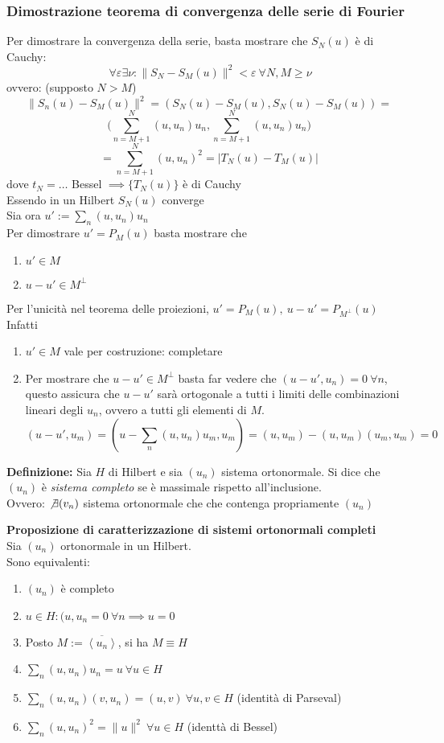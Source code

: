 \subsubsection{Dimostrazione teorema di convergenza delle serie di Fourier}
Per dimostrare la convergenza della serie, basta mostrare che $S_N(u)$ è di Cauchy:
\[\ \forall \varepsilon\exists \nu:\|S_N-S_M(u)\|^2<\varepsilon\ \forall N,M\ge \nu\]
ovvero: (supposto $N>M$)
\[\|S_n(u)-S_M(u)\|^2=(S_N(u)-S_M(u),S_N(u)-S_M(u))=\]
\[\bigg(\sum_{n=M+1}^{N} (u,u_n)u_n,\sum_{n=M+1}^{N} (u,u_n)u_n\bigg)\]
\[=\sum_{n=M+1}^{N} (u,u_n)^2=|T_N(u)-T_M(u)|\]
dove $t_N=\ldots$ 
Bessel $\implies \{T_N(u)\} $ è di Cauchy
\\Essendo in un Hilbert $S_N(u)$ converge
\\Sia ora $u':=\sum_{n}^{} (u,u_n)u_n$ 
\\Per dimostrare $u'=P_M(u)$ basta mostrare che
\begin{enumerate}
	\item $u'\in M$ 
	\item $u-u'\in M^\perp$
\end{enumerate}
Per l'unicità nel teorema delle proiezioni, $u'=P_M(u),\ u-u'=P_{M^\perp}(u)$
\\Infatti
\begin{enumerate}
	\item $u'\in M$ vale per costruzione: completare
	\item Per mostrare che $u-u'\in M^\perp$ basta far vedere che $(u-u',u_n)=0\ \forall n$, questo assicura che $u-u'$ sarà ortogonale a tutti i limiti delle combinazioni lineari degli $u_n$, ovvero a tutti gli elementi di $M$.\[(u-u',u_m)=(u-\sum_{n}^{} (u,u_n)u_m,u_m)=(u,u_m)-(u,u_m)(u_m,u_m)=0\]
\end{enumerate}
\divider
\begin{tcolorbox}
	\textbf{Definizione: }Sia $H$ di Hilbert e sia $(u_n)$ sistema ortonormale. 
	Si dice che $(u_n)$ è \emph{sistema completo} se è massimale rispetto all'inclusione.
	\\Ovvero: $\not\exists (v_n)$ sistema ortonormale che che contenga propriamente $(u_n)$
\end{tcolorbox}
\begin{tcolorbox}
	\textbf{Proposizione di caratterizzazione di sistemi ortonormali completi}
	\\Sia $(u_n)$ ortonormale in un Hilbert.
	\\Sono equivalenti:
	\begin{enumerate}
		\item $(u_n)$ è completo
		\item $u\in H:(u,u_n=0\ \forall n\implies u=0$ 
		\item Posto $M:=\overline{\left< u_n \right> }$, si ha $M\equiv H$
		\item $\sum_{n}^{} (u,u_n)u_n=u\ \forall u\in H$
		\item $\sum_{n}^{} (u,u_n)(v,u_n)=(u,v)\ \forall u,v\in H$ (identità di Parseval)
		\item $\sum_{n}^{} (u,u_n)^2=\|u\|^2\ \forall u\in H$ (identtà di Bessel)
	\end{enumerate}
\end{tcolorbox}
